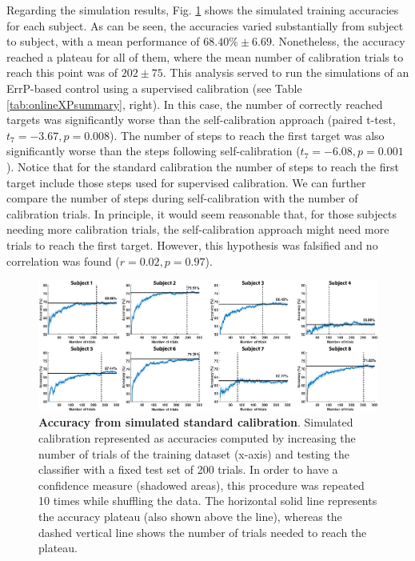 Regarding the simulation results, Fig. \ref{fig:classification} shows the simulated training accuracies for each subject. As can be seen, the accuracies varied substantially from subject to subject, with a mean performance of $68.40\% \pm 6.69$. Nonetheless, the accuracy reached a plateau for all of them, where the mean number of calibration trials to reach this point was of $202 \pm 75$. This analysis served to run the simulations of an ErrP-based control using a supervised calibration (see Table \ref{tab:onlineXPsummary}, right). In this case, the number of correctly reached targets was significantly worse than the self-calibration approach (paired t-test, $t_{7} = -3.67, p=0.008$). The number of steps to reach the first target was also significantly worse than the steps following self-calibration ($t_{7} = -6.08, p=0.001$). Notice that for the standard calibration the number of steps to reach the first target include those steps used for supervised calibration. We can further compare the number of steps during self-calibration with the number of calibration trials. In principle, it would seem reasonable that, for those subjects needing more calibration trials, the self-calibration approach might need more trials to reach the first target. However, this hypothesis was falsified and no correlation was found ($r=0.02, p=0.97$).

\begin{figure}[htbp]
\centering
\includegraphics[width=\textwidth]{figures/classification.eps}
\caption{\textbf{Accuracy from simulated standard calibration}. Simulated calibration represented as accuracies computed by increasing the number of trials of the training dataset (x-axis) and testing the classifier with a fixed test set of 200 trials. In order to have a confidence measure (shadowed areas), this procedure was repeated 10 times while shuffling the data. The horizontal solid line represents the accuracy plateau (also shown above the line), whereas the dashed vertical line shows the number of trials needed to reach the plateau.}
\label{fig:classification}
\end{figure}


